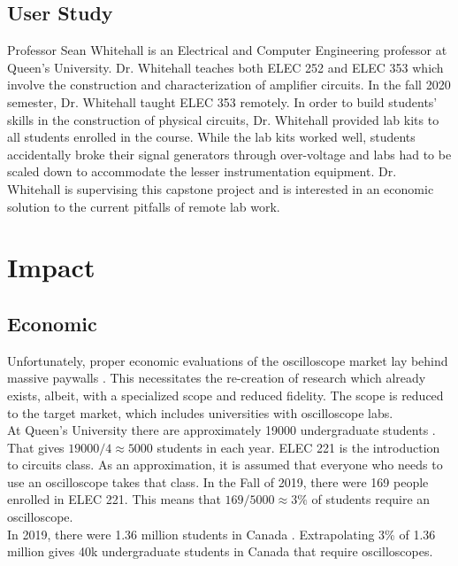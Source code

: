 \documentclass[letterpaper,12pt]{article}
\begin{document}
\subsection{User Study}
Professor Sean Whitehall is an Electrical and Computer Engineering professor at
Queen's University. Dr. Whitehall teaches both ELEC 252 and ELEC 353 which
involve the construction and characterization of amplifier circuits. In the fall
2020 semester, Dr. Whitehall taught ELEC 353 remotely. In order to build
students' skills in the construction of physical circuits, Dr. Whitehall provided
lab kits to all students enrolled in the course. While the lab kits worked well,
students accidentally broke their signal generators through over-voltage and
labs had to be scaled down to accommodate the lesser instrumentation equipment.
Dr. Whitehall is supervising this capstone project and is interested in an
economic solution to the current pitfalls of remote lab work.


\section{Impact} %

\subsection{Economic}

Unfortunately, proper economic evaluations of the oscilloscope market lay behind
massive paywalls \cite{paywalled_econ}. This necessitates the re-creation of
research which already exists, albeit, with a specialized scope and reduced
fidelity. The scope is reduced to the target market, which includes universities
with oscilloscope labs.\\

\noindent
At Queen's University there are approximately 19000 undergraduate students
\cite{queens_enroll_stats}. That gives $19000/4 \approx 5000$ students in each
year. ELEC 221 is the introduction to circuits class. As an approximation, it is
assumed that everyone who needs to use an oscilloscope takes that class. In the
Fall of 2019, there were 169 people enrolled in ELEC 221. This means that $169 /
5000 \approx 3\%$ of students require an oscilloscope.\\

\noindent
In 2019, there were 1.36 million students in Canada \cite{canada_students}.
Extrapolating 3\% of 1.36 million gives 40k undergraduate students in Canada
that require oscilloscopes.
\end{document}
